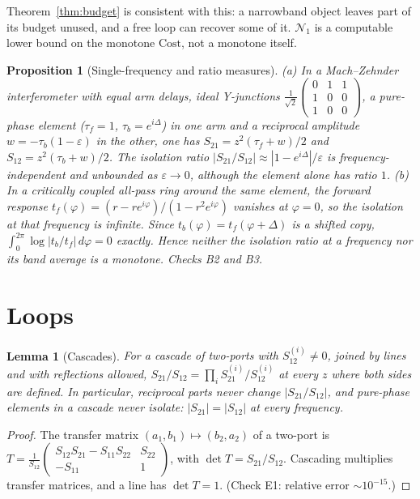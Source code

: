 \documentclass[11pt]{article}
\newtheorem{proposition}[theorem]{Proposition}
\newtheorem{lemma}[theorem]{Lemma}
\theoremstyle{definition}
\theoremstyle{remark}
\newcommand{\NN}{\mathcal N_1}
\begin{document}
Theorem~\ref{thm:budget} is consistent with this: a narrowband object leaves part of its budget unused, and a free loop can recover some of it. $\NN$ is a computable lower bound on the monotone $\mathrm{Cost}$, not a monotone itself.

\begin{proposition}[Single-frequency and ratio measures]\label{prop:single}
(a) In a Mach--Zehnder interferometer with equal arm delays, ideal Y-junctions $\frac1{\sqrt2}\left(\begin{smallmatrix}0&1&1\\1&0&0\\1&0&0\end{smallmatrix}\right)$, a pure-phase element ($\tau_f=1$, $\tau_b=e^{i\Delta}$) in one arm and a reciprocal amplitude $w=-\tau_b(1-\varepsilon)$ in the other, one has $S_{21}=z^2(\tau_f+w)/2$ and $S_{12}=z^2(\tau_b+w)/2$. The isolation ratio $|S_{21}/S_{12}|\approx|1-e^{i\Delta}|/\varepsilon$ is frequency-independent and unbounded as $\varepsilon\to0$, although the element alone has ratio $1$.
(b) In a critically coupled all-pass ring around the same element, the forward response $t_f(\varphi)=(r-re^{i\varphi})/(1-r^2e^{i\varphi})$ vanishes at $\varphi=0$, so the isolation at that frequency is infinite. Since $t_b(\varphi)=t_f(\varphi+\Delta)$ is a shifted copy, $\int_0^{2\pi}\log|t_b/t_f|\,d\varphi=0$ exactly.
Hence neither the isolation ratio at a frequency nor its band average is a monotone. Checks B2 and B3.
\end{proposition}

\section{Loops}

\begin{lemma}[Cascades]\label{lem:cascade}
For a cascade of two-ports with $S^{(i)}_{12}\ne0$, joined by lines and with reflections allowed, $S_{21}/S_{12}=\prod_iS^{(i)}_{21}/S^{(i)}_{12}$ at every $z$ where both sides are defined. In particular, reciprocal parts never change $|S_{21}/S_{12}|$, and pure-phase elements in a cascade never isolate: $|S_{21}|=|S_{12}|$ at every frequency.
\end{lemma}
\begin{proof}
The transfer matrix $(a_1,b_1)\mapsto(b_2,a_2)$ of a two-port is $T=\frac1{S_{12}}\left(\begin{smallmatrix}S_{12}S_{21}-S_{11}S_{22}&S_{22}\\-S_{11}&1\end{smallmatrix}\right)$, with $\det T=S_{21}/S_{12}$. Cascading multiplies transfer matrices, and a line has $\det T=1$. (Check E1: relative error $\sim10^{-15}$.)
\end{proof}
\end{document}
